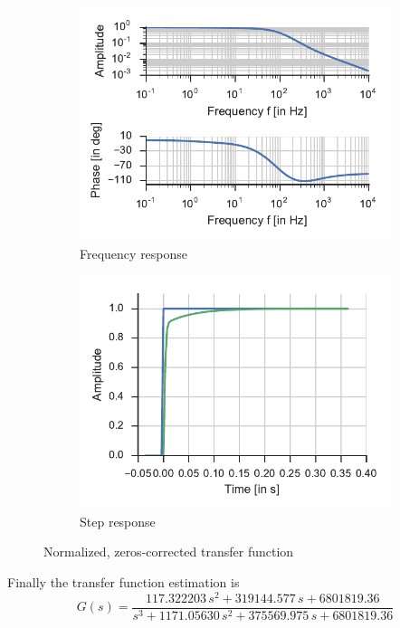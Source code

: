 \begin{figure}
	\begin{subfigure}[t]{0.5\linewidth}
		\includegraphics[width=1\linewidth]{img/ctl_id_2z}
		\caption{Frequency response}
	\end{subfigure}
	\hfill
	\begin{subfigure}[t]{0.5\linewidth}
		\includegraphics[width=1\linewidth]{img/ctl_id_2z_step}
		\caption{Step response}
	\end{subfigure}
	\caption{\label{fig:ctl_id_nospike}Normalized, zeros-corrected transfer function}
\end{figure}

Finally the transfer function estimation is 
\begin{equation}
G(s) = \frac{117.322203 \,s^2 + 319144.577 \,s + 6801819.36}
{s^3 + 1171.05630 \,s^2 + 375569.975 \,s +	6801819.36}
\end{equation}

